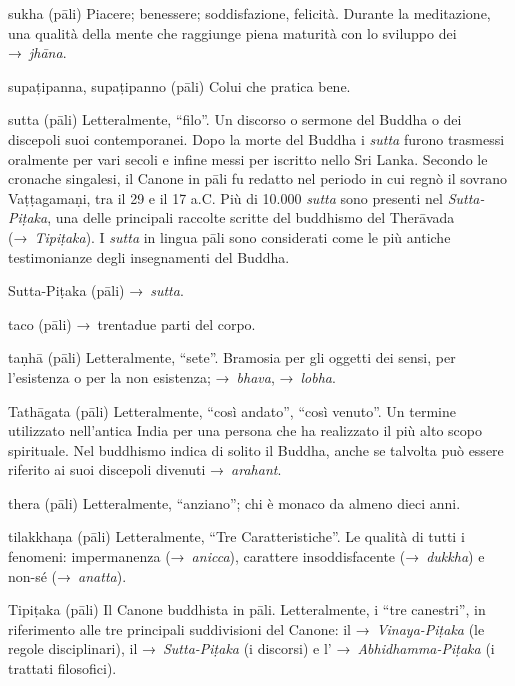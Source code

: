 \begin{glossarydescription}
\item[sukha] (pāli) Piacere; benessere; soddisfazione, felicità. Durante la
  meditazione, una qualità della mente che raggiunge piena maturità con lo
  sviluppo dei →~\emph{jhāna}.

\item[supaṭipanna, supaṭipanno] (pāli) Colui che pratica bene.

\item[sutta] (pāli) Letteralmente, ``filo''. Un discorso o sermone del Buddha o
  dei discepoli suoi contemporanei. Dopo la morte del Buddha i \emph{sutta}
  furono trasmessi oralmente per vari secoli e infine messi per iscritto nello
  Sri Lanka. Secondo le cronache singalesi, il Canone in pāli fu redatto nel
  periodo in cui regnò il sovrano Vaṭṭagamaṇi, tra il 29 e il 17 a.C. Più di
  10.000 \emph{sutta} sono presenti nel \emph{Sutta-Piṭaka}, una delle
  principali raccolte scritte del buddhismo del Therāvada (→~\emph{Tipiṭaka}). I
  \emph{sutta} in lingua pāli sono considerati come le più antiche testimonianze
  degli insegnamenti del Buddha.

\item[Sutta-Piṭaka] (pāli) →~\emph{sutta}.


\item[taco] (pāli) →~trentadue parti del corpo.

\item[taṇhā] (pāli) Letteralmente, ``sete''. Bramosia per gli oggetti dei sensi,
  per l'esistenza o per la non esistenza; →~\emph{bhava}, →~\emph{lobha}.

\item[Tathāgata] (pāli) Letteralmente, ``così andato'', ``così venuto''. Un
  termine utilizzato nell'antica India per una persona che ha realizzato il più
  alto scopo spirituale. Nel buddhismo indica di solito il Buddha, anche se
  talvolta può essere riferito ai suoi discepoli divenuti →~\emph{arahant}.

\item[thera] (pāli) Letteralmente, ``anziano''; chi è monaco da almeno dieci
  anni.

\item[tilakkhaṇa] (pāli)\label{glossary-tilakkhana} Letteralmente, ``Tre Caratteristiche''. Le qualità di
  tutti i fenomeni: impermanenza (→~\emph{anicca}), carattere insoddisfacente
  (→~\emph{dukkha}) e non-sé (→~\emph{anatta}).

\item[Tipiṭaka] (pāli) Il Canone buddhista in pāli. Letteralmente, i ``tre
  canestri'', in riferimento alle tre principali suddivisioni del Canone: il
  →~\emph{Vinaya-Piṭaka} (le regole disciplinari), il →~\emph{Sutta-Piṭaka} (i
  discorsi) e l' →~\emph{Abhidhamma-Piṭaka} (i trattati filosofici).


\end{glossarydescription}
